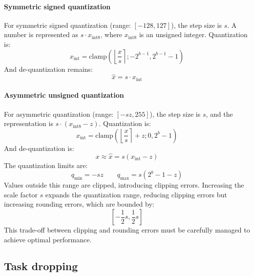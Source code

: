 \paragraph*{Symmetric signed quantization}
For symmetric signed quantization (range: $[-128, 127]$), the step size is $s$.
A number is represented as $s\cdot x_{\text{int8}}$, where $x_{\text{int8}}$ is an unsigned integer. 
Quantization is:
\[x_{\text{int}}=\text{clamp}\left(\left\lfloor \dfrac{x}{s}\right\rceil;-2^{b-1},2^{b-1}-1 \right)\]
\noindent And de-quantization remains:
\[\hat{x}=s\cdot x_{\text{int}}\]

\paragraph*{Asymmetric unsigned quantization}
For asymmetric quantization (range: $[-sz,255]$), the step size is $s$, and the representation is $s\cdot (x_{\text{int8}}-z)$. 
Quantization is:
\[x_{\text{int}}=\text{clamp}\left(\left\lfloor \dfrac{x}{s}\right\rceil+z;0,2^b-1 \right)\]
\noindent And de-quantization is:
\[x\approx\hat{x}=s(x_{\text{int}}-z)\]
\noindent The quantization limits are:
\[q_{\min}=-sz\qquad q_{\max}=s(2^b-1-z)\]
Values outside this range are clipped, introducing clipping errors. 
Increasing the scale factor $s$ expands the quantization range, reducing clipping errors but increasing rounding errors, which are bounded by:
\[\left[-\dfrac{1}{2}s,\dfrac{1}{2}s\right]\]
\noindent This trade-off between clipping and rounding errors must be carefully managed to achieve optimal performance.


\subsection{Task dropping}



